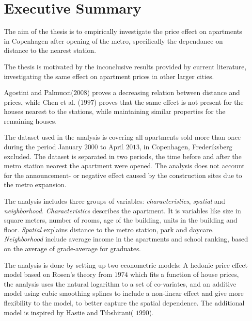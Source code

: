 \section{Executive Summary}
The aim of the thesis is to empirically investigate the price effect on 
apartments in Copenhagen after opening of the metro, specifically the dependance
on distance to the nearest station.

The thesis is motivated by the inconclusive results provided by current 
literature, investigating the same effect on apartment prices in other larger 
cities. 

Agostini and Palmucci($2008$) proves a decreasing relation between 
distance and prices, while Chen et al. ($1997$) proves that the same effect is 
not present for the houses nearest to the stations, while maintaining similar 
properties for the remaining houses.

The dataset used in the analysis is covering all apartments sold more than once 
during the period January $2000$ to April $2013$, in Copenhagen, Frederiksberg 
excluded. The dataset is separated in two periods, the time before and after the 
metro station nearest the apartment were opened. The analysis does not account 
for the announcement- or negative effect caused by the construction sites 
due to the metro expansion.  
 
The analysis includes three groups of variables: \textit{characteristics}, 
\textit{spatial} and \textit{neighborhood}. \textit{Characteristics} describes the apartment. It is variables like size in 
square meters, number of rooms, age of the building, units in the building and 
floor. \textit{Spatial} explains distance to the metro station, park and 
daycare. \textit{Neighborhood}  include average income in the apartments 
and school ranking, based on the average of grade-average for graduates. 


The analysis is done by setting up two econometric models:  A 
hedonic price effect model based on Rosen's theory from $1974$ which fits a 
function of house prices, the analysis uses the natural logarithm to a 
set of co-variates,  and an additive model using cubic smoothing splines to 
include a non-linear effect and give more flexibility to the model, to better 
capture the spatial dependence. The additional model is inspired by Hastie and 
Tibshirani( $1990$). 



